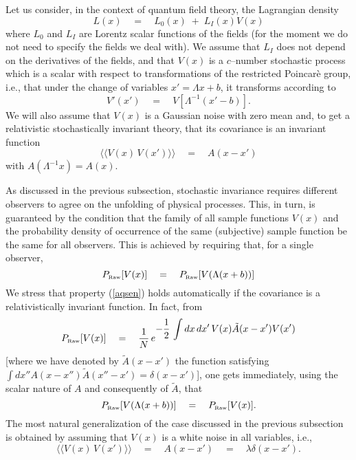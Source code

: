 \documentclass[12pt]{article}
\newcommand{\llangle}{\langle\!\langle}
\newcommand{\rrangle}{\rangle\!\rangle}
\begin{document}
Let us consider, in the context of quantum field theory, the
Lagrangian density
\begin{equation}
L(x) \quad = \quad L_{0}(x) \; + \; L_{I}(x) V(x)
\end{equation}
where $L_{0}$ and $L_{I}$ are Lorentz scalar functions of the
fields (for the moment we do not need to specify the fields we
deal with). We assume that $L_{I}$ does not depend on the
derivatives of the fields, and that $V(x)$ is a $c$--number
stochastic process which is a scalar with respect to
transformations of the restricted Poincar\`e group, i.e., that
under the change of variables $x' = \Lambda x + b$, it transforms
according to
\begin{equation}
V'(x') \quad = \quad V[\Lambda^{-1}(x'-b)].
\end{equation}
We will also assume that $V(x)$ is a Gaussian noise with zero mean
and, to get a relativistic stochastically invariant theory, that
its covariance is an invariant function
\begin{equation} \label{qredm}
\llangle V(x)\, V(x') \rrangle \quad = \quad A(x-x')
\end{equation}
with $A(\Lambda^{-1} x) = A(x)$.

As discussed in the previous subsection, stochastic invariance
requires different observers to agree on the unfolding of physical
processes. This, in turn, is guaranteed by the condition that the
family of all sample functions $V(x)$ and the probability density
of occurrence of the same (subjective) sample function be the same
for all observers. This is achieved by requiring that, for a
single observer,
\begin{equation} \label{aqsen}
P_{\makebox{\tiny Raw}}[V(x)] \quad = \quad P_{\makebox{\tiny
Raw}}[V(\Lambda(x+b))]
\end{equation}
We stress that property (\ref{aqsen}) holds automatically if the
covariance is a relativistically invariant function. In fact, from
\begin{equation} \label{djbgb}
P_{\makebox{\tiny Raw}}[V(x)] \quad = \quad \frac{1}{N}\,
e^{\displaystyle -\frac{1}{2}\, \int dx\, dx'\, V(x) \tilde
A(x-x') V(x')}
\end{equation}
[where we have denoted by $\tilde A(x-x')$ the function satisfying
$\int dx'' A(x-x'')\tilde A(x''-x') = \delta(x-x')$], one gets
immediately, using the scalar nature of $A$ and consequently of
$\tilde A$, that
\begin{equation} \label{cderfv}
P_{\makebox{\tiny Raw}}[V(\Lambda(x+b))] \quad = \quad
P_{\makebox{\tiny Raw}}[V(x)].
\end{equation}
The most natural generalization of the case discussed in the
previous subsection is obtained by assuming that $V(x)$ is a white
noise in all variables, i.e.,
\begin{equation} \label{ulilb}
\llangle V(x)\, V(x') \rrangle \quad = \quad A(x-x') \quad = \quad
\lambda \delta(x-x').
\end{equation}
\end{document}
